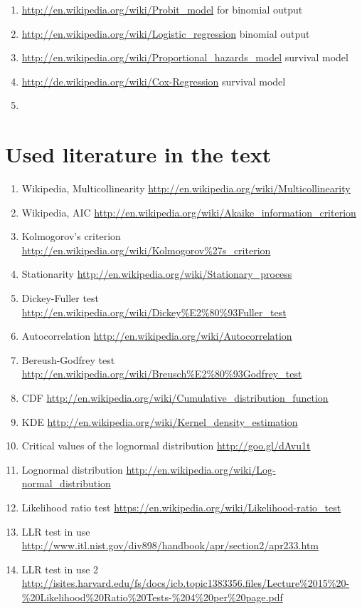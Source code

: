 \documentclass{article}
\begin{document}
\begin{enumerate}
		\begin{enumerate}
			\item \textcolor{black}{\url{http://en.wikipedia.org/wiki/Probit_model}} for binomial output
			\item \textcolor{black}{\url{http://en.wikipedia.org/wiki/Logistic_regression}}	binomial output
			\item \textcolor{black}{\url{http://en.wikipedia.org/wiki/Proportional_hazards_model}} survival model 
			\item \textcolor{black}{\url{http://de.wikipedia.org/wiki/Cox-Regression}} survival model
			\item \textcolor{black}{\url{}}
		\end{enumerate}
\end{enumerate}
\section*{Used literature in the text}
\begin{enumerate}
	\item Wikipedia, Multicollinearity \url{http://en.wikipedia.org/wiki/Multicollinearity}
	\item Wikipedia, AIC \url{http://en.wikipedia.org/wiki/Akaike_information_criterion}
	\item Kolmogorov's criterion \url{http://en.wikipedia.org/wiki/Kolmogorov\%27s_criterion}
	\item Stationarity \url{http://en.wikipedia.org/wiki/Stationary_process}
	\item Dickey-Fuller test \url{http://en.wikipedia.org/wiki/Dickey\%E2\%80\%93Fuller_test}
	\item Autocorrelation \url{http://en.wikipedia.org/wiki/Autocorrelation}
	\item Bereush-Godfrey test \url{http://en.wikipedia.org/wiki/Breusch\%E2\%80\%93Godfrey_test}
	\item CDF \url{http://en.wikipedia.org/wiki/Cumulative_distribution_function}
	\item KDE \url{http://en.wikipedia.org/wiki/Kernel_density_estimation}
	\item Critical values of the lognormal distribution \url{http://goo.gl/dAvu1t}
	\item Lognormal distribution \url{http://en.wikipedia.org/wiki/Log-normal_distribution}
	\item Likelihood ratio test \url{https://en.wikipedia.org/wiki/Likelihood-ratio_test}
	\item LLR test in use  \url{http://www.itl.nist.gov/div898/handbook/apr/section2/apr233.htm}

    \item LLR test in use 2  \url{http://isites.harvard.edu/fs/docs/icb.topic1383356.files/Lecture%2015%20-%20Likelihood%20Ratio%20Tests-%204%20per%20page.pdf}
\end{enumerate}
\end{document}
